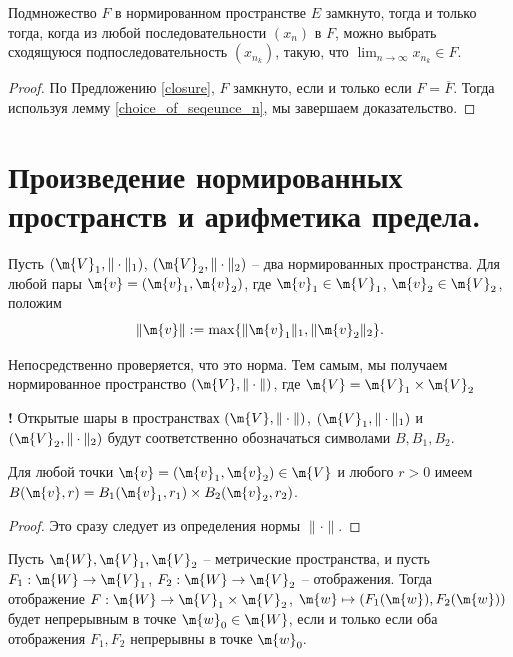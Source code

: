 \begin{corollary}\label{Weirstrass_mega}
    Подмножество $F$ в нормированном пространстве $E$ замкнуто, тогда и только тогда, когда из любой последовательности $(x_n)$ в $F$, можно выбрать сходящуюся подпоследовательность $(x_{n_k})$, такую, что $\lim_{n\to \infty} x_{n_k} \in F$. 
\end{corollary}

\begin{proof}
    По Предложению \ref{closure}, $F$ замкнуто, если и только если $F = \overline{F}$. Тогда используя лемму \ref{choice_of_seqeunce_n}, мы завершаем доказательство. 
\end{proof}



\section{Произведение нормированных пространств и арифметика предела.}

\begin{definition}
 Пусть $(\m{V}_1,\|\cdot \|_1)$, $(\m{V}_2,\|\cdot\|_2)$ -- два нормированных пространства. Для любой пары $\m{v} = (\m{v}_1,\m{v}_2)$, где $\m{v}_1 \in \m{V}_1$, $\m{v}_2\in \m{V}_2$, положим 
 \[
  \| \m{v}\|:= \max \{ \|\m{v}_1 \|_1, \| \m{v}_2 \|_2 \}.
 \]
\end{definition}

Непосредственно проверяется, что это норма. Тем самым, мы получаем нормированное пространство $(\m{V}, \|\cdot \|)$, где $\m{V} = \m{V}_1 \times \m{V}_2$

\begin{mydanger}{\bf !}
    Открытые шары в пространствах $(\m{V}, \| \cdot \|)$, $(\m{V}_1, \| \cdot \|_1)$ и $(\m{V}_2, \| \cdot \|_2)$ будут соответственно обозначаться символами $B,B_1,B_2.$
\end{mydanger}

\begin{lemma}
 Для любой точки $\m{v} = (\m{v}_1,\m{v}_2) \in \m{V}$ и любого $r >0$ имеем $ B(\m{v},r )  = B_1(\m{v}_1,r_1) \times B_2(\m{v}_2, r_2)$.
\end{lemma}
\begin{proof}
    Это сразу следует из определения нормы $\|\cdot\|.$
\end{proof}

\begin{proposition}\label{continous_of_times}
    Пусть $\m{W},\m{V}_1,\m{V}_2$ -- метрические пространства, и пусть $F_1:\m{W} \to \m{V}_1$, $F_2:\m{W} \to \m{V}_2$ -- отображения. Тогда отображение $F:\m{W} \to \m{V}_1 \times \m{V}_2$, $\m{w} \mapsto (F_1(\m{w}), F_2(\m{w}))$ будет непрерывным в точке $\m{w}_0 \in \m{W}$, если и только если оба отображения $F_1,F_2$ непрерывны в точке $\m{w}_0.$
\end{proposition}

